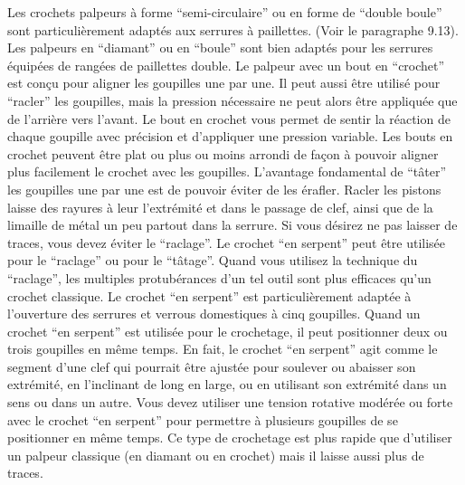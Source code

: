\documentclass[a4paper,french,11pt,twoside]{report}
\begin{document}
Les crochets palpeurs à forme \enquote{semi-circulaire} ou en forme de \enquote{double boule} sont particulièrement adaptés aux serrures à paillettes. (Voir le paragraphe 9.13). Les palpeurs en \enquote{diamant} ou en \enquote{boule} sont bien adaptés pour les serrures équipées de rangées de paillettes double. Le palpeur avec un bout en \enquote{crochet} est conçu pour aligner les goupilles une par une. Il peut aussi être utilisé pour \enquote{racler} les goupilles, mais la pression nécessaire ne peut alors être appliquée que de l'arrière vers l'avant. Le bout en crochet vous permet de sentir la réaction de chaque goupille avec précision et d'appliquer une pression variable. Les bouts en crochet peuvent être plat ou plus ou moins arrondi de façon à pouvoir aligner plus facilement le crochet avec les goupilles. L'avantage fondamental de \enquote{tâter} les goupilles une par une est de pouvoir éviter de les érafler.
Racler les pistons laisse des rayures à leur l'extrémité et dans le passage de clef, ainsi que de la limaille de métal un peu partout dans la serrure. Si vous désirez ne pas laisser de traces, vous devez éviter le \enquote{raclage}. Le crochet \enquote{en serpent} peut être utilisée pour le \enquote{raclage} ou pour le \enquote{tâtage}.
Quand vous utilisez la technique du \enquote{raclage}, les multiples protubérances d'un tel outil sont plus efficaces qu'un crochet classique. Le crochet \enquote{en serpent} est particulièrement adaptée à l'ouverture des serrures et verrous domestiques à cinq goupilles. Quand un crochet \enquote{en serpent} est utilisée pour le crochetage, il peut positionner deux ou trois goupilles en même temps. En fait, le crochet \enquote{en serpent} agit comme le segment d'une clef qui pourrait être ajustée pour soulever ou abaisser son extrémité, en l'inclinant de long en large, ou en utilisant son extrémité dans un sens ou dans un autre. Vous devez utiliser une tension rotative modérée ou forte avec le crochet \enquote{en serpent} pour permettre à plusieurs goupilles de se positionner en même temps. Ce type de crochetage est plus rapide que d'utiliser un palpeur classique (en diamant ou en crochet) mais il laisse aussi plus de traces.
\end{document}
